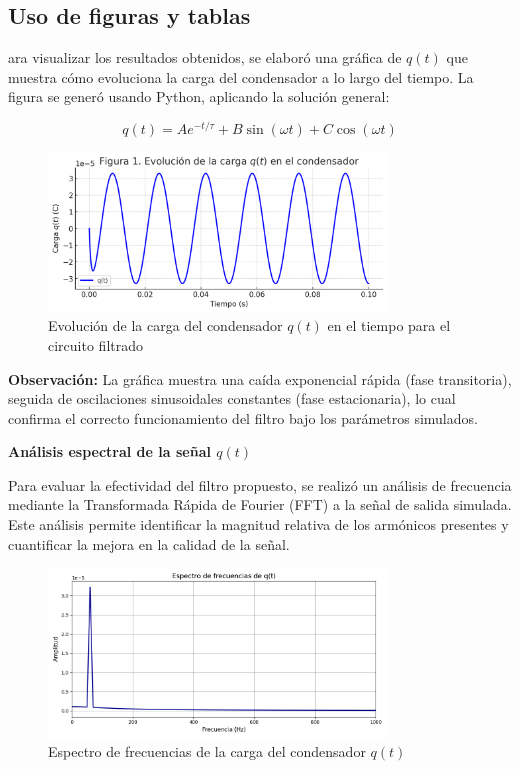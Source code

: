 \subsection{Uso de figuras y tablas}
ara visualizar los resultados obtenidos, se elaboró una gráfica de \( q(t) \) que muestra cómo evoluciona la carga del condensador a lo largo del tiempo. La figura se generó usando Python, aplicando la solución general:

\[ q(t) = Ae^{-t/\tau} + B \sin(\omega t) + C \cos(\omega t) \]

\begin{figure}[H]
	\centering
	\includegraphics[width=0.8\textwidth]{7.png} %
	\caption{Evolución de la carga del condensador \( q(t) \) en el tiempo para el circuito filtrado}
	\label{fig:evolucion_carga}
\end{figure}

\textbf{Observación:} La gráfica muestra una caída exponencial rápida (fase transitoria), seguida de oscilaciones sinusoidales constantes (fase estacionaria), lo cual confirma el correcto funcionamiento del filtro bajo los parámetros simulados.

\vspace{0.5cm}

\textbf{Análisis espectral de la señal \( q(t) \)}

Para evaluar la efectividad del filtro propuesto, se realizó un análisis de frecuencia mediante la Transformada Rápida de Fourier (FFT) a la señal de salida simulada. Este análisis permite identificar la magnitud relativa de los armónicos presentes y cuantificar la mejora en la calidad de la señal.

\begin{figure}[H]
	\centering
	\includegraphics[width=0.8\textwidth]{8.png} %
	\caption{Espectro de frecuencias de la carga del condensador \( q(t) \)}
	\label{fig:espectro_frecuencias}
\end{figure}

